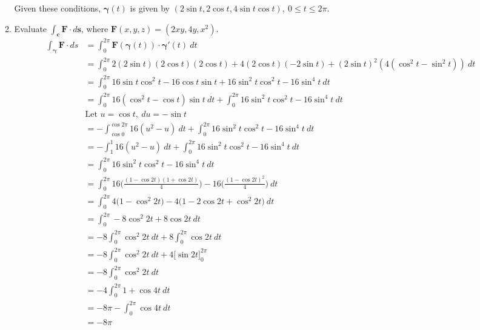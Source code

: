 \documentclass{article}
\newcommand{\gam}{\boldsymbol{\gamma}}
\begin{document}
\begin{enumerate}
\begin{enumerate}
                Given these conditions, $\gam(t)$ is given by $(2 \sin t, 2 \cos t, 4 \sin t \cos t), \: 0 \leq t \leq 2\pi$.
            \item Evaluate $\displaystyle \int_{\boldsymbol{c}} \boldsymbol{F} \cdot d \boldsymbol{s}$, where $\boldsymbol{F}(x,y,z) = (2xy,4y,x^2)$.
                \begin{align*}
                    \int_{\gam} \boldsymbol{F} \cdot ds &= \int^{2\pi}_0 \boldsymbol{F}(\gam(t)) \cdot \gam'(t) \ dt \\
                    &= \int^{2\pi}_0 2(2 \sin t)(2 \cos t)(2 \cos t) + 4 (2 \cos t)(- 2 \sin t) + (2 \sin t)^2(4(\cos^2t - \sin^2t)) \ dt \\
                    &= \int^{2\pi}_0 16\sin t\cos^2 t - 16 \cos t \sin t  + 16 \sin^2 t \cos^2t - 16 \sin^4t \ dt \\
                    &= \int^{2\pi}_0 16(\cos^2 t - \cos t)\sin t  \ dt + \int^{2\pi}_0 16 \sin^2 t \cos^2t - 16 \sin^4t \ dt \\
                    &\text{Let $u = \cos t, \ du = -\sin t$} \\
                    &= -\int^{\cos 2\pi}_{\cos{0}} 16(u^2 - u)  \ dt + \int^{2\pi}_0 16 \sin^2 t \cos^2t - 16 \sin^4t \ dt \\
                    &= -\int^{1}_{1} 16(u^2 - u)  \ dt + \int^{2\pi}_0 16 \sin^2 t \cos^2t - 16 \sin^4t \ dt \\
                    &=  \int^{2\pi}_0 16 \sin^2 t \cos^2t - 16 \sin^4t \ dt \\
                    &=  \int^{2\pi}_0 16 \Big(\frac{(1 - \cos 2t)(1 + \cos 2t)}{4} \Big) - 16\Big(\frac{(1- \cos 2t)^2}{4} \Big) \ dt \\
                    &=  \int^{2\pi}_0 4 \Big(1 - \cos^2 2t \Big) - 4\Big(1 - 2\cos 2t+ \cos^2 2t \Big) \ dt \\
                    &=  \int^{2\pi}_0 - 8\cos^2 2t  + 8\cos 2t \ dt \\
                    &= -8 \int^{2\pi}_0 \cos^2 2t \ dt + 8 \int^{2\pi}_0 \cos 2t \ dt \\
                    &= -8 \int^{2\pi}_0 \cos^2 2t \ dt + 4 \Big[ \sin 2t\Big]_0^{2\pi} \\
                    &= -8 \int^{2\pi}_0 \cos^2 2t \ dt \\
                    &= -4 \int^{2\pi}_0 1 + \cos 4t  \ dt \\
                    &= -8\pi - \int^{2\pi}_0  \cos 4t  \ dt \\
                    &= -8\pi\\
                \end{align*}
        \end{enumerate}
\end{enumerate}
\end{document}
